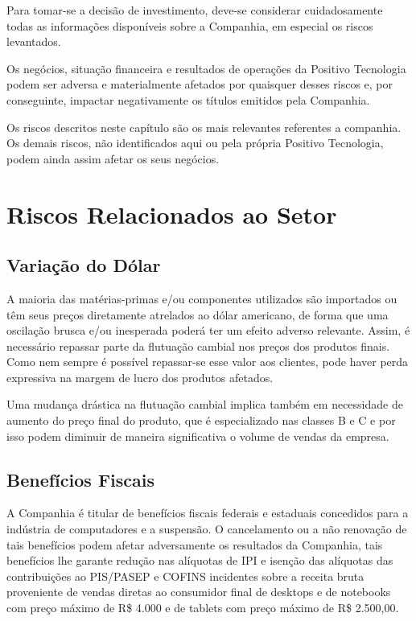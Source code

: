 \label{chap:macro}
Para tomar-se a decisão de investimento, deve-se considerar cuidadosamente todas as informações disponíveis sobre a Companhia, em especial os riscos levantados.

Os negócios, situação financeira e resultados de operações da Positivo Tecnologia podem ser adversa e materialmente afetados por quaisquer desses riscos e, por conseguinte, impactar negativamente os títulos emitidos pela Companhia.

Os riscos descritos neste capítulo são os mais relevantes referentes a companhia. Os demais riscos, não identificados aqui ou pela própria Positivo Tecnologia, podem ainda assim afetar os seus negócios.

\section{Riscos Relacionados ao Setor}

\subsection{Variação do Dólar} A maioria das matérias-primas e/ou componentes utilizados são importados ou têm seus preços diretamente atrelados ao dólar americano, de forma que uma oscilação brusca e/ou inesperada poderá ter um efeito adverso relevante. Assim, é necessário repassar parte da flutuação cambial nos preços dos produtos finais. Como nem sempre é possível repassar-se esse valor aos clientes, pode haver perda expressiva na margem de lucro dos produtos afetados.

Uma mudança drástica na flutuação cambial implica também em necessidade de aumento do preço final do produto, que é especializado nas classes B e C e por isso podem diminuir de maneira significativa o volume de vendas da empresa.

\subsection{Benefícios Fiscais} 
A Companhia é titular de benefícios fiscais federais e estaduais concedidos para a indústria de computadores e a suspensão. O cancelamento ou a não renovação de tais benefícios podem afetar adversamente os resultados da Companhia, tais benefícios lhe garante redução nas alíquotas de IPI e isenção das alíquotas das contribuições ao PIS/PASEP e COFINS incidentes sobre a receita bruta proveniente de vendas diretas ao consumidor final de desktops e de notebooks com preço máximo de R\$ 4.000 e de tablets com preço máximo de R\$ 2.500,00.

